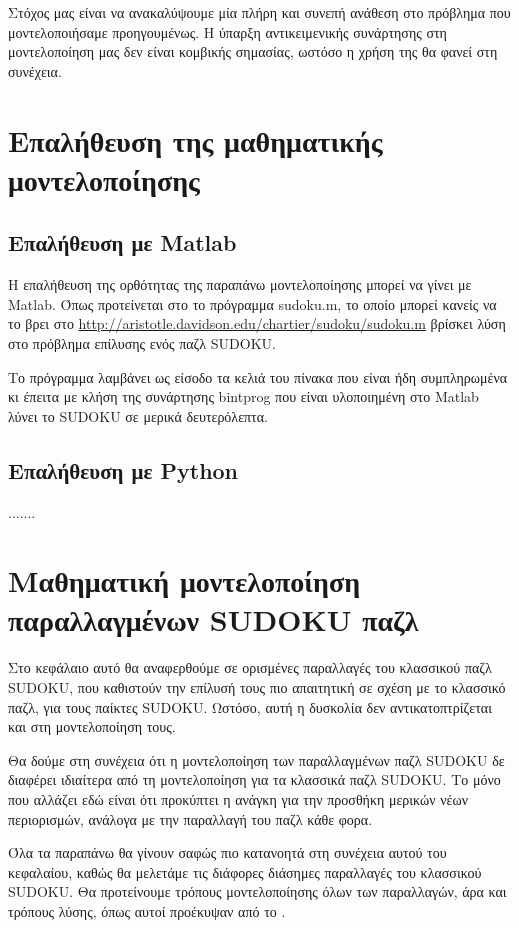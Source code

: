 \documentclass[12pt]{book}
\theoremstyle{definition}
\begin{document}
Στόχος μας είναι να ανακαλύψουμε μία πλήρη και συνεπή ανάθεση στο πρόβλημα που μοντελοποιήσαμε προηγουμένως. Η ύπαρξη αντικειμενικής συνάρτησης στη μοντελοποίηση μας δεν είναι κομβικής σημασίας, ωστόσο η χρήση της θα φανεί στη συνέχεια.

\section{Επαλήθευση της μαθηματικής μοντελοποίησης}

\subsection{Επαλήθευση με Matlab}

Η επαλήθευση της ορθότητας της παραπάνω μοντελοποίησης μπορεί να γίνει με Matlab. Όπως προτείνεται στο \cite{3} το πρόγραμμα sudoku.m, το οποίο μπορεί κανείς να το βρει στο \url{http://aristotle.davidson.edu/chartier/sudoku/sudoku.m} βρίσκει λύση στο πρόβλημα επίλυσης ενός παζλ SUDOKU. \par

Το πρόγραμμα λαμβάνει ως είσοδο τα κελιά του πίνακα που είναι ήδη συμπληρωμένα κι έπειτα με κλήση της συνάρτησης bintprog που είναι υλοποιημένη στο Matlab λύνει το SUDOKU σε μερικά δευτερόλεπτα. 

\subsection{Επαλήθευση με Python}
.......

\section{Μαθηματική μοντελοποίηση παραλλαγμένων SUDOKU παζλ}

Στο κεφάλαιο αυτό θα αναφερθούμε σε ορισμένες παραλλαγές του κλασσικού παζλ SUDOKU, που καθιστούν την επίλυσή τους πιο απαιτητική σε σχέση με το κλασσικό παζλ, για τους παίκτες SUDOKU. Ωστόσο, αυτή η δυσκολία δεν αντικατοπτρίζεται και στη μοντελοποίηση τους. \par 

Θα δούμε στη συνέχεια ότι η μοντελοποίηση των παραλλαγμένων παζλ SUDOKU δε διαφέρει ιδιαίτερα από τη μοντελοποίηση για τα κλασσικά παζλ SUDOKU. Το μόνο που αλλάζει εδώ είναι ότι προκύπτει η ανάγκη για την προσθήκη μερικών νέων περιορισμών, ανάλογα με την παραλλαγή του παζλ κάθε φορα. \par

Όλα τα παραπάνω θα γίνουν σαφώς πιο κατανοητά στη συνέχεια αυτού του κεφαλαίου, καθώς θα μελετάμε τις διάφορες διάσημες παραλλαγές του κλασσικού SUDOKU. Θα προτείνουμε τρόπους μοντελοποίησης όλων των παραλλαγών, άρα και τρόπους λύσης, όπως αυτοί προέκυψαν από το \cite{3}.
\end{document}
